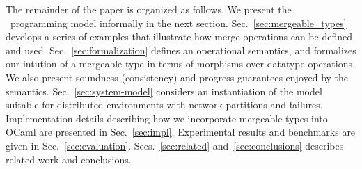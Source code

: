 The remainder of the paper is organized as follows.  We present the
\name\ programming model informally in the next section.
Sec.~\ref{sec:mergeable_types} develops a series of examples that
illustrate how merge operations can be defined and used.
Sec.~\ref{sec:formalization} defines an operational semantics, and
formalizes our intution of a mergeable type in terms of morphisms over
datatype operations.  We also present soundness (consistency) and
progress guarantees enjoyed by the
semantics. Sec.~\ref{sec:system-model} considers an instantiation of
the model suitable for distributed environments with network
partitions and failures.  Implementation details describing how we
incorporate mergeable types into OCaml are presented in
Sec.~\ref{sec:impl}.  Experimental results and benchmarks are given in
Sec.~\ref{sec:evaluation}.  Secs.~\ref{sec:related}
and~\ref{sec:conclusions} describes related work and conclusions.





